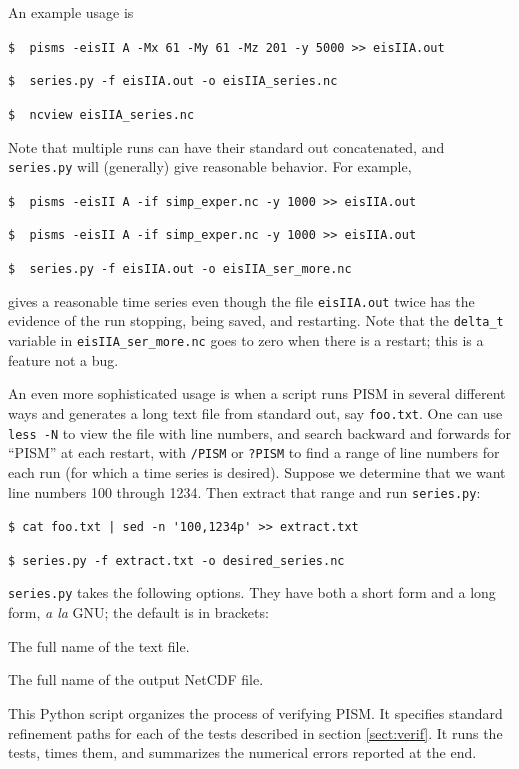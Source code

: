 \documentclass[11pt,final]{amsart}
\newcommand{\und}{\_\!\_}
\begin{document}
An example usage is

\verb|$  pisms -eisII A -Mx 61 -My 61 -Mz 201 -y 5000 >> eisIIA.out|

\verb|$  series.py -f eisIIA.out -o eisIIA_series.nc|

\verb|$  ncview eisIIA_series.nc|

\noindent Note that multiple runs can have their standard out concatenated, and \verb|series.py| will (generally) give reasonable behavior.  For example,

\verb|$  pisms -eisII A -if simp_exper.nc -y 1000 >> eisIIA.out|

\verb|$  pisms -eisII A -if simp_exper.nc -y 1000 >> eisIIA.out|

\verb|$  series.py -f eisIIA.out -o eisIIA_ser_more.nc|

\noindent gives a reasonable time series even though the file \verb|eisIIA.out| twice has the evidence of the run stopping, being saved, and restarting.  Note that the \verb|delta_t| variable in \verb|eisIIA_ser_more.nc| goes to zero when there is a restart; this is a feature not a bug.

An even more sophisticated usage is when a script runs PISM in several different ways and generates a long text file from standard out, say \verb|foo.txt|.  One can use \verb|less -N| to view the file with line numbers, and search backward and forwards  for ``PISM'' at each restart, with \verb|/PISM| or  \verb|?PISM| to find a range of line numbers for each run (for which a time series is desired).  Suppose we determine that we want line numbers 100 through 1234.  Then extract that range and run \verb|series.py|:

\verb#$ cat foo.txt | sed -n '100,1234p' >> extract.txt# 

\verb|$ series.py -f extract.txt -o desired_series.nc|

\opthead  \verb|series.py| takes the following options.  They have both a short form and a long form, \emph{a la} GNU; the default is in brackets:

 The full name of the text file.

\scriptoptdef{o}{out}{series\und out.nc} The full name of the output NetCDF file.


  This Python script organizes the process of verifying PISM.  It specifies standard refinement paths for each of the tests described in section \ref{sect:verif}.  It runs the tests, times them, and summarizes the numerical errors reported at the end.
\end{document}
